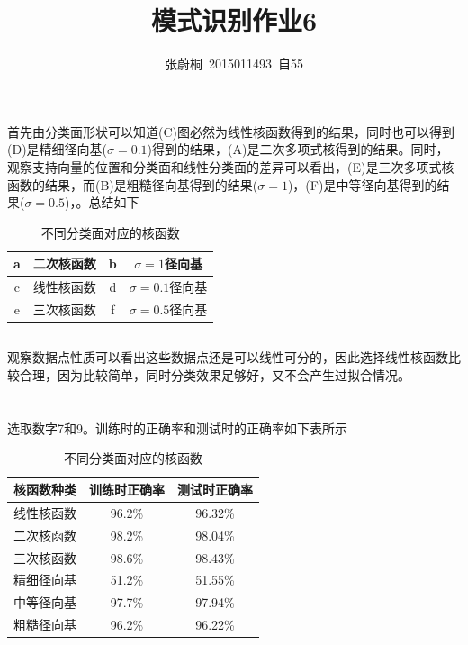 \documentclass[UTF8,a4paper]{ctexart}
\title{模式识别作业6}
\author{张蔚桐\ 2015011493\ 自55}
\begin{document}
\maketitle
\section{}
\subsection{}
首先由分类面形状可以知道(C)图必然为线性核函数得到的结果，同时也可以得到(D)是精细径向基($\sigma=0.1$)得到的结果，(A)是二次多项式核得到的结果。同时，观察支持向量的位置和分类面和线性分类面的差异可以看出，(E)是三次多项式核函数的结果，而(B)是粗糙径向基得到的结果($\sigma=1$)，(F)是中等径向基得到的结果($\sigma=0.5$)，。总结如下

\begin{table}
\caption{不同分类面对应的核函数}
\centering
\begin{tabular}{|c|c|c|c|}
\hline
a &二次核函数& b &$\sigma=1$径向基 \\
\hline
c &线性核函数& d &$\sigma=0.1$径向基\\
\hline
e &三次核函数& f &$\sigma=0.5$径向基 \\
\hline
\end{tabular}
\end{table}
\subsection{}
观察数据点性质可以看出这些数据点还是可以线性可分的，因此选择线性核函数比较合理，因为比较简单，同时分类效果足够好，又不会产生过拟合情况。
\section{}
选取数字7和9。训练时的正确率和测试时的正确率如下表所示
\begin{table}
\caption{不同分类面对应的核函数}
\centering
\begin{tabular}{|c|c|c|}
\hline
核函数种类&训练时正确率&测试时正确率\\
\hline
线性核函数&96.2\%&96.32\%\\
\hline
二次核函数&98.2\%&98.04\%\\
\hline
三次核函数&98.6\%&98.43\%\\
\hline
精细径向基&51.2\%&51.55\%\\
\hline
中等径向基&97.7\%&97.94\%\\
\hline
粗糙径向基&96.2\%&96.22\%\\
\hline
\end{tabular}
\end{table}
\end{document}
